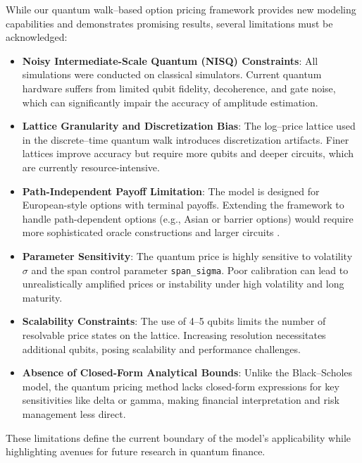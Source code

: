 \documentclass[11pt]{article}
\begin{document}
While our quantum walk–based option pricing framework provides new modeling capabilities and demonstrates promising results, several limitations must be acknowledged:

\begin{itemize}
    \item \textbf{Noisy Intermediate-Scale Quantum (NISQ) Constraints}: All simulations were conducted on classical simulators. Current quantum hardware suffers from limited qubit fidelity, decoherence, and gate noise, which can significantly impair the accuracy of amplitude estimation.
    
    \item \textbf{Lattice Granularity and Discretization Bias}: The log–price lattice used in the discrete–time quantum walk introduces discretization artifacts. Finer lattices improve accuracy but require more qubits and deeper circuits, which are currently resource-intensive.
    
    \item \textbf{Path-Independent Payoff Limitation}: The model is designed for European-style options with terminal payoffs. Extending the framework to handle path-dependent options (e.g., Asian or barrier options) would require more sophisticated oracle constructions and larger circuits \cite{schuld2015introduction}.
    
    \item \textbf{Parameter Sensitivity}: The quantum price is highly sensitive to volatility $\sigma$ and the span control parameter \texttt{span\_sigma}. Poor calibration can lead to unrealistically amplified prices or instability under high volatility and long maturity.
    
    \item \textbf{Scalability Constraints}: The use of 4–5 qubits limits the number of resolvable price states on the lattice. Increasing resolution necessitates additional qubits, posing scalability and performance challenges.
    
    \item \textbf{Absence of Closed-Form Analytical Bounds}: Unlike the Black–Scholes model, the quantum pricing method lacks closed-form expressions for key sensitivities like delta or gamma, making financial interpretation and risk management less direct.
\end{itemize}

These limitations define the current boundary of the model’s applicability while highlighting avenues for future research in quantum finance.
\end{document}
